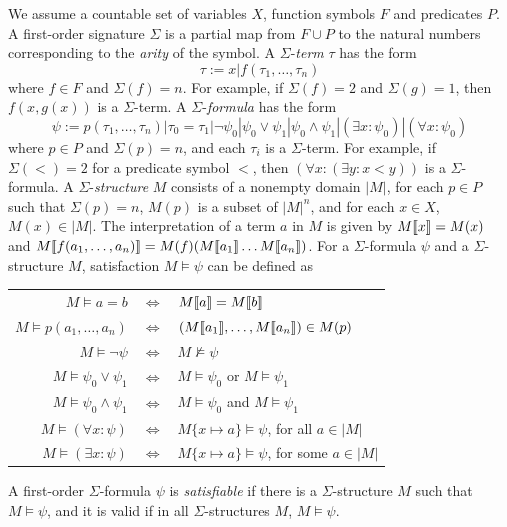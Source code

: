 We assume a countable set of variables $X$, function symbols $F$ and predicates $P$.\cite{ToSMT}
A first-order signature $\Sigma$ is a partial map from $F \cup P$ to the natural numbers corresponding to the {\it arity} of the symbol.
A $\Sigma$-{\it term} $\tau$ has the form
\begin{equation}
\label{eq:SigmaTerm}
\tau := x | f(\tau _{1}, \dots, \tau _{n})
\end{equation}
where $f \in F$ and $\Sigma(f) = n$. For example, if $\Sigma(f) = 2$ and $\Sigma(g) = 1$, then $f(x, g(x))$ is a $\Sigma$-term.
A $\Sigma$-{\it formula} has the form
\begin{equation}
\label{eq:SigmaFormula}
\psi := p(\tau _{1}, \dots, \tau _{n}) | \tau _{0} = \tau _{1} | \neg \psi _{0} | \psi _{0} \vee \psi _{1} | \psi _{0} \wedge \psi _{1} | (\exists x : \psi _{0}) | (\forall x : \psi _{0})
\end{equation}
where $p \in P$ and $\Sigma(p) = n$, and each $\tau _{i}$ is a $\Sigma$-term. For example, if $\Sigma(<) = 2$ for a predicate symbol $<$, then $(\forall x : (\exists y : x < y))$ is a $\Sigma$-formula.
A $\Sigma$-{\it structure} $M$ consists of a nonempty domain $|M|$, for each $p \in P$ such that $\Sigma(p) = n$, $M(p)$ is a subset of $|M|^{n}$, and for each $x \in X$, $M(x) \in |M|$.
The interpretation of a term $a$ in $M$ is given by $M\llbracket x \rrbracket = M(x)$ and $M\llbracket f(a_{1},\dots,a_{n})\rrbracket = M(f)(M\llbracket a_{1}\rrbracket\dots M\llbracket a_{n}\rrbracket )$.
For a $\Sigma$-formula $\psi$ and a $\Sigma$-structure $M$, satisfaction $M \models \psi$ can be defined as

\emptyline
\begin{center}
\begin{tabular}{rcl}
$M\models a = b$                      & $\Longleftrightarrow$ &   $M\llbracket a\rrbracket = M\llbracket b\rrbracket$                            \\
$M\models p(a_{1},\dots,a_{n})$       & $\Longleftrightarrow$ &   $(M\llbracket a_{1}\rrbracket,\dots,M\llbracket a_{n}\rrbracket) \in M(p)$     \\
$M\models\neg\psi$                    & $\Longleftrightarrow$ &   $M\not\models\psi$                                     \\
$M\models \psi _{0}\vee\psi _{1}$     & $\Longleftrightarrow$ &   $M \models\psi _{0}$ or $M\models\psi _{1}$            \\
$M\models \psi _{0}\wedge\psi _{1}$   & $\Longleftrightarrow$ &   $M\models\psi _{0}$ and $M\models\psi _{1}$            \\
$M\models (\forall x : \psi)$         & $\Longleftrightarrow$ &   $M\{x\mapsto a\}\models\psi$, for all $a\in |M|$       \\
$M\models (\exists x : \psi)$         & $\Longleftrightarrow$ &   $M\{x\mapsto a\}\models\psi$, for some $a\in |M|$      \\
\end{tabular}
\end{center}
\emptyline

A first-order $\Sigma$-formula $\psi$ is {\it satisfiable} if there is a $\Sigma$-structure $M$ such that $M \models\psi$, and it is valid if in all $\Sigma$-structures $M$, $M \models\psi$.
